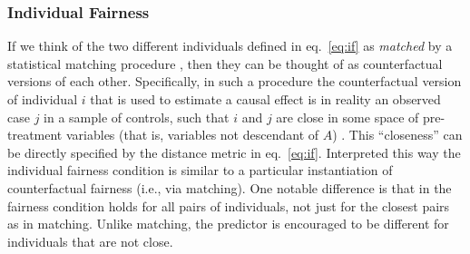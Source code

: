 \documentclass{article}
\newcommand{\cind}[0]{\mathrel{\text{\scalebox{1.07}{$\perp\mkern-10mu\perp$}}}}
\begin{document}

\subsubsection{Individual Fairness}
If we think of the two different individuals defined in eq.~\eqref{eq:if} as \emph{matched} by a statistical matching procedure \cite{morgan:15}, then they can be thought of as counterfactual versions of each other. Specifically, in such a procedure the counterfactual version of
individual $i$ that is used to estimate a causal effect is in reality an
observed case $j$ in a sample of controls, such that $i$ and $j$
are close in some space of pre-treatment variables (that is,
variables not descendant of $A$) \cite{morgan:15}. This ``closeness'' can be directly specified by the distance metric in eq.~\eqref{eq:if}. Interpreted this way the individual fairness condition is similar to a particular instantiation of counterfactual fairness (i.e., via matching). One notable difference is that in \cite{dwork2012fairness} the fairness condition holds for all pairs of individuals, not just for the closest pairs as in matching. Unlike matching, the predictor is encouraged to be different for individuals that are not close.
\end{document}
